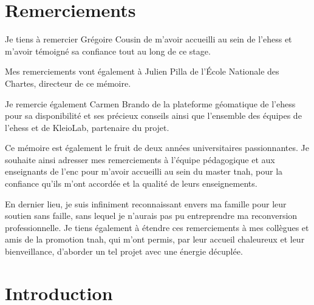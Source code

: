 \documentclass[a4paper,12pt,twoside]{book}
\begin{document}
	\pagestyle{empty}	
	\cleardoublepage

	\pagestyle{plain}
	\chapter*{Remerciements}
	
		Je tiens à remercier Grégoire Cousin de m'avoir accueilli au sein de l’\gls{ehess} et m'avoir témoigné sa confiance tout au long de ce stage.
		
		Mes remerciements vont également à Julien Pilla de l'École Nationale des Chartes, directeur de ce mémoire.
		
		Je remercie également Carmen Brando de la plateforme géomatique de l'\gls{ehess} pour sa disponibilité et ses précieux conseils ainsi que l'ensemble des équipes de l'\gls{ehess} et de KleioLab, partenaire du projet.
		
		Ce mémoire est également le fruit de deux années universitaires passionnantes. Je souhaite ainsi adresser mes remerciements à l'équipe pédagogique et aux enseignants de l'\gls{enc} pour m'avoir accueilli au sein du master \gls{tnah}, pour la confiance qu'ils m'ont accordée et la qualité de leurs enseignements. 
		
		En dernier lieu, je suis infiniment reconnaissant envers ma famille pour leur soutien sans faille, sans lequel je n'aurais pas pu entreprendre ma reconversion professionnelle. Je tiens également à étendre ces remerciements à mes collègues et amis de la promotion \gls{tnah}, qui m'ont permis, par leur accueil chaleureux et leur bienveillance, d'aborder un tel projet avec une énergie décuplée.
		
	\pagestyle{empty}	
	\cleardoublepage
	
	\pagestyle{plain}
	\tableofcontents
	
	\pagestyle{empty}	
	\cleardoublepage
		
	\mainmatter
	
	\pagestyle{plain}
	
	\makeatletter
    \let\savedchap\@makeschapterhead
    \def\@makeschapterhead{\vspace*{-3cm}\savedchap}
	
	\chapter*{Introduction}
	
	\let\@makeschapterhead\savedchap
    \makeatletter
	\vspace{-1cm}
	    
\end{document}
